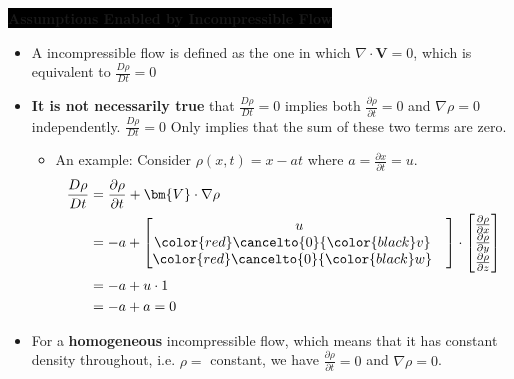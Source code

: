 \colorbox{black}{\textbf{\color{white}Assumptions Enabled by Incompressible Flow}}
\begin{itemize}
    \item A incompressible flow is defined as the one in which $\nabla \cdot \bm{V} = 0$, which is equivalent to $\frac{D\rho}{Dt} = 0$
    \item \textbf{\color{teal}It is not necessarily true} that $\frac{D\rho}{Dt}=0$ implies both $\frac{\partial \rho}{\partial t}=0$ and $\nabla \rho = 0$ independently. $\frac{D\rho}{Dt}=0$ Only implies that the sum of these two terms are zero. 
    \begin{itemize}
        \item An example: Consider $\rho(x,t)=x-at$ where $a = \frac{\partial x}{\partial t}= u$.
        \begin{align*}
            \frac{D\rho}{Dt} &= \frac{\partial \rho}{\partial t} + \bm{V}\cdot \nabla \rho \\
            &= -a + \begin{bmatrix}
                u \\
                {\color{red}\cancelto{0}{\color{black}v}} \quad \\
                {\color{red}\cancelto{0}{\color{black}w}} \quad
            \end{bmatrix} \cdot \begin{bmatrix}
                \frac{\partial \rho}{\partial x} \\
                \frac{\partial \rho}{\partial y} \\
                \frac{\partial \rho}{\partial z} 
            \end{bmatrix} \\
            &= -a +u \cdot 1 \\
            &= -a + a =0
        \end{align*}
    \end{itemize}
    \item For a \textbf{\color{red}homogeneous} incompressible flow, which means that it has constant density throughout, i.e. $\rho =$ constant, we have $\frac{\partial \rho}{\partial t}=0$ and $\nabla \rho = 0$.
\end{itemize}
